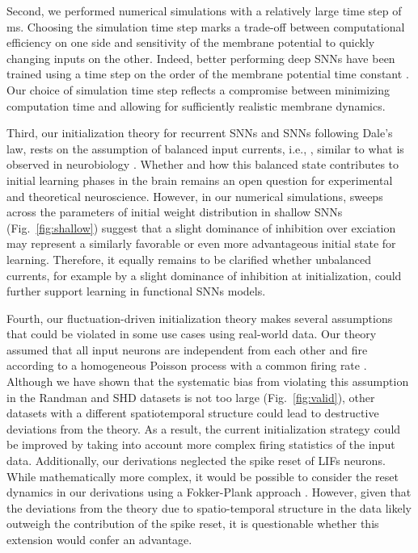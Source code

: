 \documentclass[11pt,a4paper]{article}
\begin{document}
Second, we performed numerical simulations with a relatively large time step of \,ms. 
Choosing the simulation time step marks a trade-off between computational efficiency on one side and sensitivity of the membrane potential to quickly changing inputs on the other. 
Indeed, better performing deep \acp{SNN} have been trained using a time step on the order of the membrane potential time constant \citep{Na2022-vb,Ding2021-ql}. 
Our choice of simulation time step reflects a compromise between minimizing computation time and allowing for sufficiently realistic membrane dynamics. 

Third, our initialization theory for recurrent \acp{SNN} and \acp{SNN} following Dale's law, rests on the assumption of balanced input currents, i.e., , similar to what is observed in neurobiology \citep{brunel_dynamics_2000, vogels_neural_2005}.
Whether and how this balanced state contributes to initial learning phases in the brain remains an open question for experimental and theoretical neuroscience.
However, in our numerical simulations, sweeps across the parameters of initial weight distribution in shallow \acp{SNN} (Fig.~\ref{fig:shallow}) suggest that a slight dominance of inhibition over exciation may represent a similarly favorable or even more advantageous initial state for learning.
Therefore, it equally remains to be clarified whether unbalanced currents, for example by a slight dominance of inhibition at initialization, could further support learning in functional \acp{SNN} models. 

Fourth, our fluctuation-driven initialization theory makes several assumptions that could be violated in some use cases using real-world data. 
Our theory assumed that all input neurons are independent from each other and fire according to a homogeneous Poisson process with a common firing rate .
Although we have shown that the systematic bias from violating this assumption in the Randman and \ac{SHD} datasets is not too large (Fig.~\ref{fig:valid}), other datasets with a different spatiotemporal structure could lead to destructive deviations from the theory.
As a result, the current initialization strategy could be improved by taking into account more complex firing statistics of the input data.
Additionally, our derivations neglected the spike reset of \acp{LIF} neurons.
While mathematically more complex, it would be possible to consider the reset dynamics in our derivations using a Fokker-Plank approach \citep{Amit1997-ds}.
However, given that the deviations from the theory due to spatio-temporal structure in the data likely outweigh the contribution of the spike reset, it is questionable whether this extension would confer an advantage.
\end{document}
